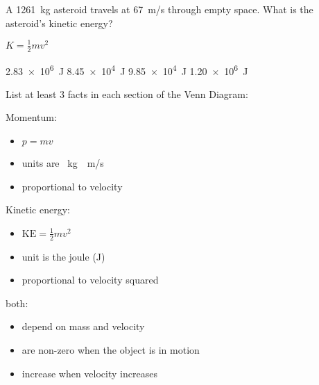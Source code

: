 \documentclass[]{exam}
\begin{document}
\begin{questions}
\question \label{X7RPxf}
A \SI{1261}{kg} asteroid travels at \SI{67}{m/s} through empty space. What is the asteroid's kinetic energy?

\ifprintanswers
{\color{red}
$K = \frac{1}{2} m v^2$
}
\fi


\begin{randomizechoices}
    \correctchoice \SI{2.83e6}{J}
    \choice \SI{8.45e4}{J}
    \choice \SI{9.85e4}{J}
    \choice \SI{1.20e6}{J}
\end{randomizechoices}


\question %
List at least 3 facts in each section of the Venn Diagram:

\begin{center}
\end{center}

\begin{solution}

\phantom{.}

Momentum:

\begin{itemize}[itemsep=0pt,topsep=0pt]
    \item $p=mv$
    \item units are \SI{}{kg\cdot m/s}
    \item proportional to velocity
\end{itemize}

\bigskip

Kinetic energy:

\begin{itemize}[itemsep=0pt,topsep=0pt]
    \item $\mathrm{KE} = \frac{1}{2} mv^2$
    \item unit is the joule (J) 
    \item proportional to velocity squared
\end{itemize}

\bigskip

both:

\begin{itemize}[itemsep=0pt,topsep=0pt]
    \item depend on mass and velocity
    \item are non-zero when the object is in motion
    \item increase when velocity increases
\end{itemize}
\end{solution}


\end{questions}
\end{document}
